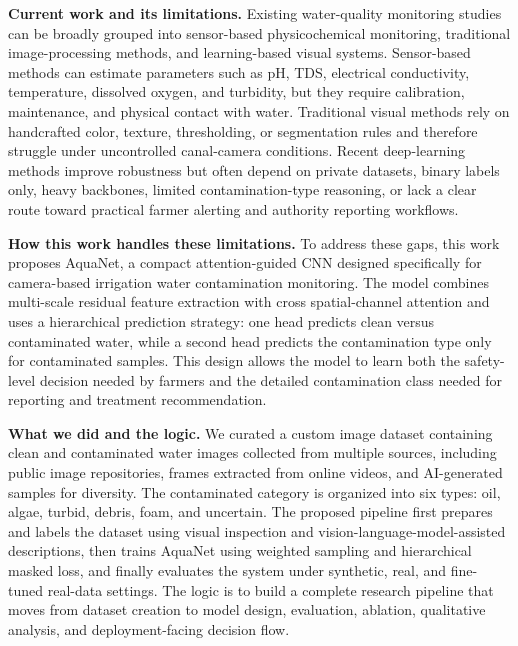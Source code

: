 \documentclass[journal]{IEEEtran}
\newcommand{\method}{AquaNet}
\begin{document}
\textbf{Current work and its limitations.}
Existing water-quality monitoring studies can be broadly grouped into sensor-based physicochemical monitoring, traditional image-processing methods, and learning-based visual systems. Sensor-based methods can estimate parameters such as pH, TDS, electrical conductivity, temperature, dissolved oxygen, and turbidity, but they require calibration, maintenance, and physical contact with water. Traditional visual methods rely on handcrafted color, texture, thresholding, or segmentation rules and therefore struggle under uncontrolled canal-camera conditions. Recent deep-learning methods improve robustness but often depend on private datasets, binary labels only, heavy backbones, limited contamination-type reasoning, or lack a clear route toward practical farmer alerting and authority reporting workflows.

\textbf{How this work handles these limitations.}
To address these gaps, this work proposes \method{}, a compact attention-guided CNN designed specifically for camera-based irrigation water contamination monitoring. The model combines multi-scale residual feature extraction with cross spatial-channel attention and uses a hierarchical prediction strategy: one head predicts clean versus contaminated water, while a second head predicts the contamination type only for contaminated samples. This design allows the model to learn both the safety-level decision needed by farmers and the detailed contamination class needed for reporting and treatment recommendation.

\textbf{What we did and the logic.}
We curated a custom image dataset containing clean and contaminated water images collected from multiple sources, including public image repositories, frames extracted from online videos, and AI-generated samples for diversity. The contaminated category is organized into six types: oil, algae, turbid, debris, foam, and uncertain. The proposed pipeline first prepares and labels the dataset using visual inspection and vision-language-model-assisted descriptions, then trains \method{} using weighted sampling and hierarchical masked loss, and finally evaluates the system under synthetic, real, and fine-tuned real-data settings. The logic is to build a complete research pipeline that moves from dataset creation to model design, evaluation, ablation, qualitative analysis, and deployment-facing decision flow.
\end{document}
